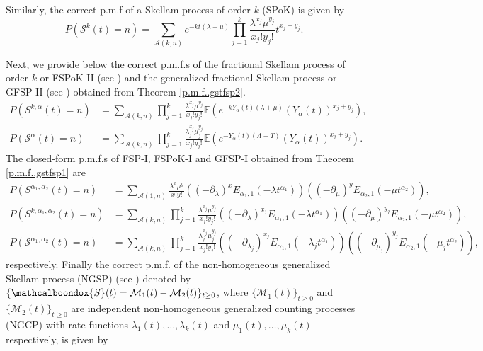 \documentclass[11pt,oneside,reqno]{amsart}
\theoremstyle{definition}
\theoremstyle{remarkstyle}
\begin{document}
Similarly, the correct p.m.f of a Skellam process of order $k$ (SPoK) is given by
    \begin{equation*}
        P(\mathcal{S}^k(t)=n)=\sum_{\mathcal{A}(k,n)}e^{-kt(\lambda+\mu)}\prod_{j=1}^{k}\frac{\lambda^{x_j}\mu^{y_j}}{x_j!y_j!}t^{x_j+y_j}.
    \end{equation*}

Next, we provide below the correct p.m.f.s of the fractional Skellam process of order $k$ or FSPoK-II (see \citet{kataria2024}) and the generalized fractional Skellam process or GFSP-II (see \citet{Kataria2022b}) obtained from Theorem \ref{p.m.f..gstfsp2}.
\begin{align*}
P(S^{k,\alpha}(t)=n)&=\sum_{\mathcal{A}(k,n)}\prod_{j=1}^{k}\frac{\lambda^{x_j}\mu^{y_j}}{x_j!y_j!}\mathbb{E}(e^{-kY_\alpha(t)(\lambda+\mu)}(Y_\alpha(t))^{x_j+y_j}), \\
P(\mathcal{S}^{\alpha}(t)=n)&=\sum_{\mathcal{A}(k,n)}\prod_{j=1}^{k}\frac{\lambda_j^{x_j}\mu_j^{y_j}}{x_j!y_j!}\mathbb{E}(e^{-Y_\alpha(t)(\Lambda+T)}(Y_\alpha(t))^{x_j+y_j}). 
\end{align*}
The closed-form p.m.f.s of FSP-I, FSPoK-I and GFSP-I obtained from Theorem \ref{p.m.f..gstfsp1} are
\begin{align*}
  P(S^{\alpha_1,\alpha_2}(t)=n)&=\sum_{\mathcal{A}(1,n)}\frac{\lambda^{x}\mu^{y}}{x!y!}((-\partial_\lambda)^{x}E_{\alpha_1,1}(-\lambda t^{\alpha_1}))((-\partial_\mu)^{y}E_{\alpha_2,1}(-\mu t^{\alpha_2})),\\
  P(S^{k,\alpha_1,\alpha_2}(t)=n)&=\sum_{\mathcal{A}(k,n)}\prod_{j=1}^{k}\frac{\lambda^{x_j}\mu^{y_j}}{x_j!y_j!}((-\partial_{\lambda})^{x_j}E_{\alpha_1,1}(-\lambda t^{\alpha_1}))((-\partial_{\mu})^{y_j}E_{\alpha_2,1}(-\mu t^{\alpha_2})),\\
  P(\mathcal{S}^{\alpha_1,\alpha_2}(t)=n)&=\sum_{\mathcal{A}(k,n)}\prod_{j=1}^{k}\frac{\lambda_j^{x_j}\mu_j^{y_j}}{x_j!y_j!}((-\partial_{\lambda_j})^{x_j}E_{\alpha_1,1}(-\lambda_j t^{\alpha_1}))((-\partial_{\mu_j})^{y_j}E_{\alpha_2,1}(-\mu_j t^{\alpha_2})),
\end{align*}
respectively. Finally the correct p.m.f. of the non-homogeneous generalized Skellam process (NGSP) (see \citet{Tathe2024}) denoted by $\{\mathcalboondox{S}(t)=\mathcal{M}_1(t)-\mathcal{M}_2(t)\}_{t\ge 0}$, where $\{\mathcal{M}_1(t)\}_{t\ge 0}$ and $\{\mathcal{M}_2(t)\}_{t\ge 0}$ are independent non-homogeneous generalized counting processes (NGCP) with rate functions $\lambda_1(t),\ldots,\lambda_k(t)$ and $\mu_1(t),\ldots,\mu_k(t)$ respectively, is given by
\end{document}
